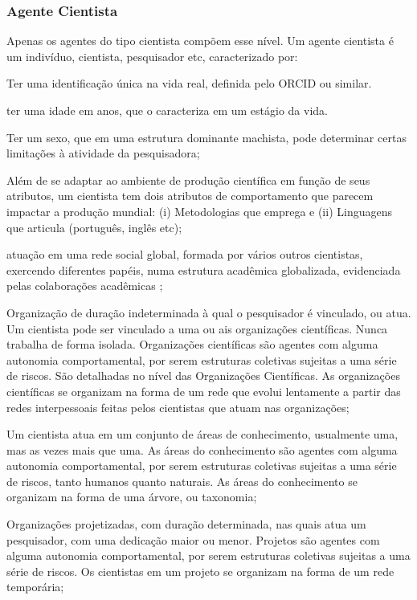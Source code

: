 \subsubsection{Agente Cientista}
Apenas os agentes do tipo cientista compõem esse nível. 
Um agente cientista é um indivíduo, cientista, pesquisador etc, caracterizado por:
    \begin{description}
        \item [número de identificação] Ter uma identificação única na vida real, definida pelo ORCID ou similar. 
        \item [idade] ter uma idade em anos, que o caracteriza em um estágio da vida.
        \item [sexo] Ter um sexo, que em uma estrutura dominante machista, pode determinar certas limitações à atividade da pesquisadora;
        \item [Comportamentos individuais] Além de se adaptar ao ambiente de produção científica em função de seus atributos, um cientista tem dois atributos de comportamento que parecem impactar a produção mundial: (i) Metodologias que emprega e (ii) Linguagens que articula (português, inglês etc);
        \item atuação em uma rede social global, formada por vários outros cientistas, exercendo diferentes papéis, numa estrutura acadêmica globalizada, evidenciada pelas colaborações acadêmicas \cite{sampaio_as_2015}; 
        \item [Organização científica] Organização de duração indeterminada à qual o pesquisador é vinculado, ou atua. Um cientista pode ser vinculado a uma ou ais organizações científicas. Nunca trabalha de forma isolada. Organizações científicas são agentes com alguma autonomia comportamental, por serem estruturas coletivas sujeitas a uma série de riscos. São detalhadas no nível das Organizações Científicas. As organizações científicas se organizam na forma de um rede que evolui lentamente a partir das redes interpessoais feitas pelos cientistas que atuam nas organizações; 
        
        \item [áreas de conhecimento] Um cientista atua em um conjunto de áreas de conhecimento, usualmente uma, mas as vezes mais que uma. As áreas do conhecimento são agentes com alguma autonomia comportamental, por serem estruturas coletivas sujeitas a uma série de riscos, tanto humanos quanto naturais. As áreas do conhecimento se organizam na forma de uma árvore, ou taxonomia;
        
        \item [Projetos] Organizações projetizadas, com duração determinada, nas quais atua um pesquisador, com uma dedicação maior ou menor. Projetos são agentes com alguma autonomia comportamental, por serem estruturas coletivas sujeitas a uma série de riscos. Os cientistas em um projeto se organizam na forma de um rede temporária; 
    \end{description}

